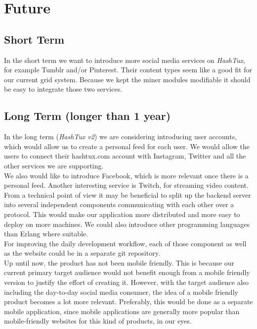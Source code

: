 \hypertarget{future}{
\chapter{Future}}

\section{Short Term}
In the short term we want to introduce more social media services on
\textit{HashTux}, for example Tumblr and/or Pinterest. Their content types seem
like a good fit for our current grid system. Because we kept the miner modules
modifiable it should be easy to integrate those two services.

\section{Long Term (longer than 1 year)}
In the long term (\textit{HashTux v2}) we are considering introducing user
accounts, which would allow us to create a personal feed for each user. We would
allow the users to connect their hashtux.com account with Instagram, Twitter and
all the other services we are supporting. \\

We also would like to introduce Facebook, which is more relevant once there is a
personal feed. Another interesting service is Twitch, for streaming video
content. \\

From a technical point of view it may be beneficial to split up the backend
server into several independent components communicating with each other over a
protocol. This would make our application more distributed and more easy to
deploy on more machines. We could also introduce other programming languages
than Erlang where suitable. \\

For improving the daily development workflow, each of those component as well as
the website could be in a separate git repository. \\

Up until now, the product has not been mobile friendly. This is because our
current primary target audience would not benefit enough from a mobile friendly
version to justify the effort of creating it. However, with the target audience
also including the day-to-day social media consumer, the idea of a mobile
friendly product becomes a lot more relevant. Preferably, this would be done as
a separate mobile application, since mobile applications are generally more
popular than mobile-friendly websites for this kind of products, in our eyes.
